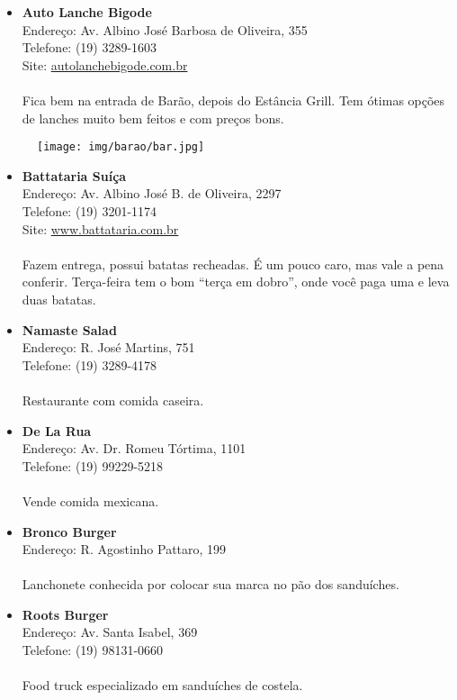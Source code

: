 \begin{itemize}
\item \textbf{Auto Lanche Bigode}
  \\Endereço: Av. Albino José Barbosa de Oliveira, 355
  \\Telefone: (19) 3289-1603
  \\Site: \url{autolanchebigode.com.br}
  \\
  \\Fica bem na entrada de Barão, depois do Estância Grill. Tem ótimas opções de
  lanches muito bem feitos e com preços bons.
\end{itemize}

\begin{figure}[h!]
  \centering
  \texttt{[image: img/barao/bar.jpg]}
\end{figure}

\begin{itemize}
\item \textbf{Battataria Suíça}
  \\Endereço: Av. Albino José B. de Oliveira, 2297
  \\Telefone: (19) 3201-1174
  \\Site: \url{www.battataria.com.br}
  \\
  \\Fazem entrega, possui batatas recheadas. É um pouco caro, mas vale a pena
  conferir. Terça-feira tem o bom ``terça em dobro'', onde você paga uma e leva
  duas batatas.

\item \textbf{Namaste Salad}
  \\Endereço: R. José Martins, 751
  \\Telefone: (19) 3289-4178
  \\
  \\Restaurante com comida caseira.

\item \textbf{De La Rua}
  \\Endereço: Av. Dr. Romeu Tórtima, 1101
  \\Telefone: (19) 99229-5218
  \\
  \\Vende comida mexicana.

\item \textbf{Bronco Burger}
  \\Endereço: R. Agostinho Pattaro, 199
  \\
  \\Lanchonete conhecida por colocar sua marca no pão dos sanduíches.

\item \textbf{Roots Burger}
  \\Endereço: Av. Santa Isabel, 369
  \\Telefone: (19) 98131-0660
  \\
  \\Food truck especializado em sanduíches de costela.
\end{itemize}

